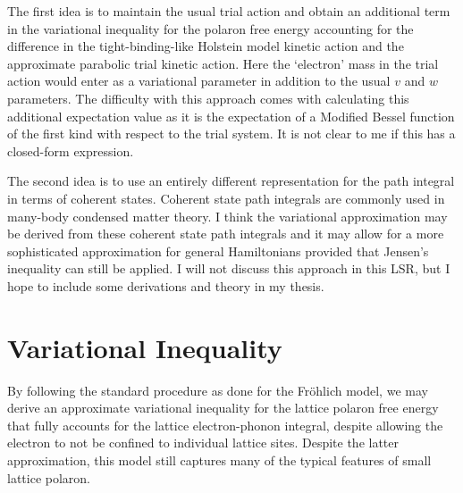 The first idea is to maintain the usual trial action and obtain an additional term in the variational inequality for the polaron free energy accounting for the difference in the tight-binding-like Holstein model kinetic action and the approximate parabolic trial kinetic action. Here the `electron' mass in the trial action would enter as a variational parameter in addition to the usual $v$ and $w$ parameters. The difficulty with this approach comes with calculating this additional expectation value as it is the expectation of a Modified Bessel function of the first kind with respect to the trial system. It is not clear to me if this has a closed-form expression.
\newline

The second idea is to use an entirely different representation for the path integral in terms of coherent states. Coherent state path integrals are commonly used in many-body condensed matter theory. I think the variational approximation may be derived from these coherent state path integrals and it may allow for a more sophisticated approximation for general Hamiltonians provided that Jensen's inequality can still be applied. I will not discuss this approach in this LSR, but I hope to include some derivations and theory in my thesis.

\section{Variational Inequality}

By following the standard procedure as done for the Fr\"ohlich model, we may derive an approximate variational inequality for the lattice polaron free energy that fully accounts for the lattice electron-phonon integral, despite allowing the electron to not be confined to individual lattice sites. Despite the latter approximation, this model still captures many of the typical features of small lattice polaron.
\newline

